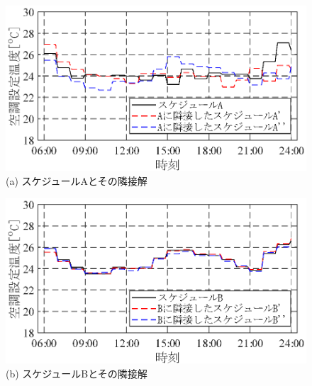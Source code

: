 \begin{figure}[htbp]
  \begin{center}
    \begin{minipage}{0.5\textwidth}
      \begin{center}
        \includegraphics[width=1.0\textwidth,keepaspectratio=true]{fig/sim_result_schedule_a_settemp_diff.eps}\\{(a) スケジュールAとその隣接解}
      \end{center}
    \end{minipage}
    \begin{minipage}{0.5\textwidth}
      \begin{center}
        \includegraphics[width=1.0\textwidth,keepaspectratio=true]{fig/sim_result_schedule_b_settemp_diff.eps}\\{(b) スケジュールBとその隣接解}
      \end{center}
    \end{minipage}
    \begin{minipage}{0.5\textwidth}
      \begin{center}

\end{center}
\end{minipage}
\end{center}
\end{figure}
